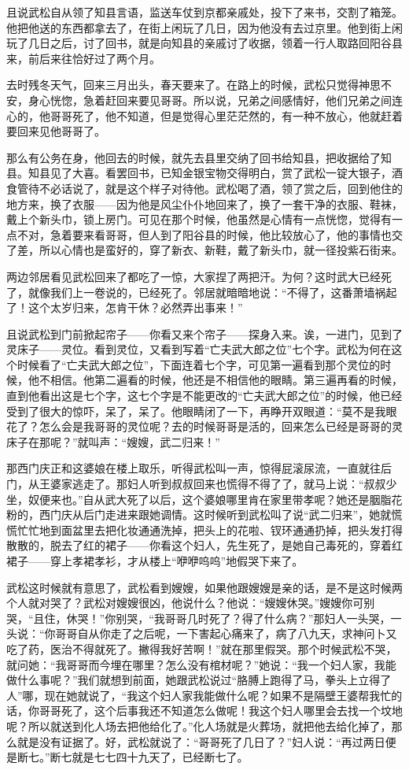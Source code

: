 \par 且说武松自从领了知县言语，监送车仗到京都亲戚处，投下了来书，交割了箱笼。他把他送的东西都拿去了，在街上闲玩了几日，因为他没有去过京里。他到街上闲玩了几日之后，讨了回书，就是向知县的亲戚讨了收据，领着一行人取路回阳谷县来，前后来往恰好过了两个月。
\par 去时残冬天气，回来三月出头，春天要来了。在路上的时候，武松只觉得神思不安，身心恍惚，急着赶回来要见哥哥。所以说，兄弟之间感情好，他们兄弟之间连心的，他哥哥死了，他不知道，但是觉得心里茫茫然的，有一种不放心，他就赶着要回来见他哥哥了。
\par 那么有公务在身，他回去的时候，就先去县里交纳了回书给知县，把收据给了知县。知县见了大喜。看罢回书，已知金银宝物交得明白，赏了武松一锭大银子，酒食管待不必话说了，就是这个样子对待他。武松喝了酒，领了赏之后，回到他住的地方来，换了衣服——因为他是风尘仆仆地回来了，换了一套干净的衣服、鞋袜，戴上个新头巾，锁上房门。可见在那个时候，他虽然是心情有一点恍惚，觉得有一点不对，急着要来看哥哥，但人到了阳谷县的时候，他比较放心了，他的事情也交了差，所以心情也是蛮好的，穿了新衣、新鞋，戴了新头巾，就一径投紫石街来。
\par 两边邻居看见武松回来了都吃了一惊，大家捏了两把汗。为何？这时武大已经死了，就像我们上一卷说的，已经死了。邻居就暗暗地说：“不得了，这番萧墙祸起了！这个太岁归来，怎肯干休？必然弄出事来！”
\par 且说武松到门前掀起帘子——你看又来个帘子——探身入来。诶，一进门，见到了灵床子——灵位。看到灵位，又看到写着“亡夫武大郎之位”七个字。武松为何在这个时候看了“亡夫武大郎之位”，下面连着七个字，可见第一遍看到那个灵位的时候，他不相信。他第二遍看的时候，他还是不相信他的眼睛。第三遍再看的时候，直到他看出这是七个字，这七个字是不能更改的“亡夫武大郎之位”的时候，他已经受到了很大的惊吓，呆了，呆了。他眼睛闭了一下，再睁开双眼道：“莫不是我眼花了？怎么会是我哥哥的灵位呢？去的时候哥哥是活的，回来怎么已经是哥哥的灵床子在那呢？”就叫声：“嫂嫂，武二归来！”
\par 那西门庆正和这婆娘在楼上取乐，听得武松叫一声，惊得屁滚尿流，一直就往后门，从王婆家逃走了。那妇人听到叔叔回来也慌得不得了了，就马上说：“叔叔少坐，奴便来也。”自从武大死了以后，这个婆娘哪里肯在家里带孝呢？她还是胭脂花粉的，西门庆从后门走进来跟她调情。这时候听到武松叫了说“武二归来”，她就慌慌忙忙地到面盆里去把化妆通通洗掉，把头上的花啦、钗环通通扔掉，把头发打得散散的，脱去了红的裙子——你看这个妇人，先生死了，是她自己毒死的，穿着红裙子——穿上孝裙孝衫，才从楼上“咿咿呜呜”地假哭下来了。
\par 武松这时候就有意思了，武松看到嫂嫂，如果他跟嫂嫂是亲的话，是不是这时候两个人就对哭了？武松对嫂嫂很凶，他说什么？他说：“嫂嫂休哭。”嫂嫂你可别哭，“且住，休哭！”你别哭，“我哥哥几时死了？得了什么病？”那妇人一头哭，一头说：“你哥哥自从你走了之后呢，一下害起心痛来了，病了八九天，求神问卜又吃了药，医治不得就死了。撇得我好苦啊！”就在那里假哭。那个时候武松不哭，就问她：“我哥哥而今埋在哪里？怎么没有棺材呢？”她说：“我一个妇人家，我能做什么事呢？”我们就想到前面，她跟武松说过“胳膊上跑得了马，拳头上立得了人”哪，现在她就说了，“我这个妇人家我能做什么呢？如果不是隔壁王婆帮我忙的话，你哥哥死了，这个后事我还不知道怎么做呢！我这个妇人哪里会去找一个坟地呢？所以就送到化人场去把他给化了。”化人场就是火葬场，就把他去给化掉了，那么就是没有证据了。好，武松就说了：“哥哥死了几日了？”妇人说：“再过两日便是断七。”断七就是七七四十九天了，已经断七了。

